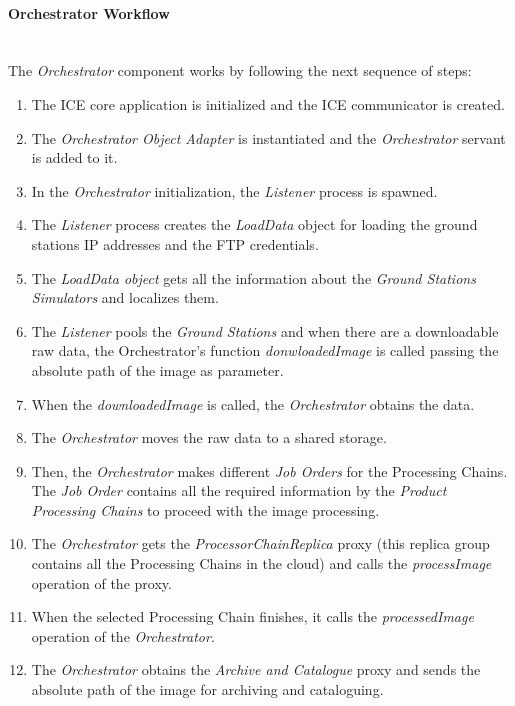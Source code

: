 \paragraph{Orchestrator Workflow}~\\

The \emph{Orchestrator} component works by following the next sequence of steps:
\begin{enumerate}
\item The ICE core application is initialized and the ICE communicator is
  created.
\item The \emph{Orchestrator Object Adapter} is instantiated and the \emph{Orchestrator} servant is
  added to it.
\item In the \emph{Orchestrator} initialization, the \emph{Listener} process is spawned.
\item The \emph{Listener} process creates the \emph{LoadData} object for loading the ground
  stations \ac{IP} addresses and the \ac{FTP} credentials.
\item The \emph{LoadData object} gets all the information about the \emph{Ground
    Stations Simulators} and localizes them.
\item The \emph{Listener} pools the \emph{Ground Stations} and when there are
  a downloadable raw data, the Orchestrator's function \emph{donwloadedImage} is
  called passing the absolute path of the image as parameter. 
\item  When the \emph{downloadedImage} is called, the \emph{Orchestrator}
  obtains the data.
\item  The \emph{Orchestrator} moves the raw data to a shared storage.
\item Then, the \emph{Orchestrator} makes different \emph{Job Orders} for the Processing Chains. The \emph{Job Order} contains all the required information by the \emph{Product Processing Chains} to proceed with the image processing.
\item The \emph{Orchestrator} gets the \emph{ProcessorChainReplica} proxy (this
  replica group contains all the Processing Chains in the cloud) and calls the
  \emph{processImage} operation of the proxy.
\item When the selected Processing Chain finishes, it calls the \emph{processedImage}
  operation of the \emph{Orchestrator}.
\item The \emph{Orchestrator} obtains the \emph{Archive and Catalogue} proxy and
  sends the absolute path of the image for archiving and cataloguing.
\end{enumerate}


